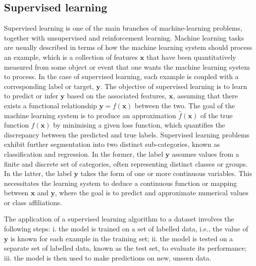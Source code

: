 \subsection{Supervised learning}
Supervised learning is one of the main branches of machine-learning problems, together with unsupervised and reinforcement learning. Machine learning tasks are usually described in terms of how the machine learning system should process an example, which is a collection of features $\mathbf{x}$ that have been quantitatively measured from some object or event that one wants the machine learning system to process. In the case of supervised learning, each example is coupled with a corresponding label or target, $\mathbf{y}$. The objective of supervised learning is to learn to predict or infer $\mathbf{y}$ based on the associated features, $\mathbf{x}$, assuming that there exists a functional relationship $\mathbf{y} = f(\mathbf{x})$ between the two. The goal of the machine learning system is to produce an approximation $\widehat{f}(\mathbf{x})$ of the true function $f(\mathbf{x})$ by minimising a given loss function, which quantifies the discrepancy between the predicted and true labels. Supervised learning problems exhibit further segmentation into two distinct sub-categories, known as classification and regression. In the former, the label $\mathbf{y}$ assumes values from a finite and discrete set of categories, often representing distinct classes or groups. In the latter, the label $\mathbf{y}$ takes the form of one or more continuous variables. This necessitates the learning system to deduce a continuous function or mapping between $\mathbf{x}$ and $\mathbf{y}$, where the goal is to predict and approximate numerical values or class affiliations.

The application of a supervised learning algorithm to a dataset involves the following steps: i. the model is trained on a set of labelled data, i.e., the value of $\mathbf{y}$ is known for each example in the training set; ii. the model is tested on a separate set of labelled data, known as the test set, to evaluate its performance; iii. the model is then used to make predictions on new, unseen data.

